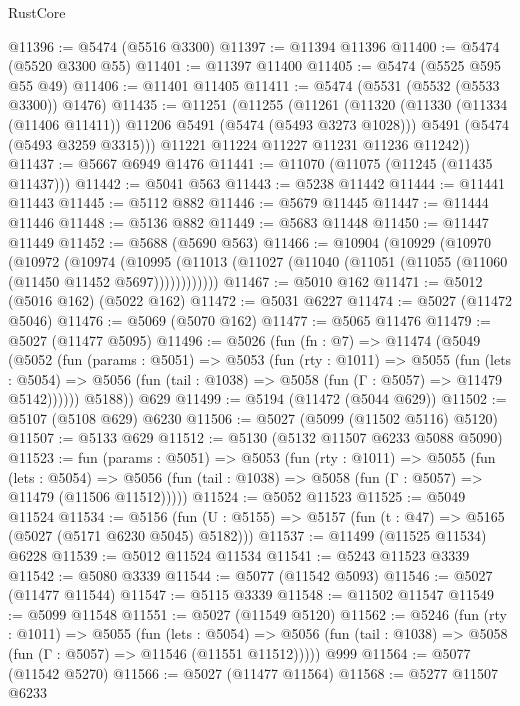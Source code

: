 \begin{lexlean}{RustCore}
\begin{coremodule}
@11396 := @5474 (@5516 @3300)
@11397 := @11394 @11396
@11400 := @5474 (@5520 @3300 @55)
@11401 := @11397 @11400
@11405 := @5474 (@5525 @595 @55 @49)
@11406 := @11401 @11405
@11411 := @5474 (@5531 (@5532 (@5533 @3300)) @1476)
@11435 := @11251
    (@11255
      (@11261
        (@11320
          (@11330 (@11334 (@11406 @11411)) @11206 @5491 (@5474 (@5493 @3273 @1028)))
          @5491
          (@5474 (@5493 @3259 @3315)))
        @11221
        @11224
        @11227
        @11231
        @11236
        @11242))
@11437 := @5667 @6949 @1476
@11441 := @11070 (@11075 (@11245 (@11435 @11437)))
@11442 := @5041 @563
@11443 := @5238 @11442
@11444 := @11441 @11443
@11445 := @5112 @882
@11446 := @5679 @11445
@11447 := @11444 @11446
@11448 := @5136 @882
@11449 := @5683 @11448
@11450 := @11447 @11449
@11452 := @5688 (@5690 @563)
@11466 := @10904
    (@10929
      (@10970
        (@10972
          (@10974
            (@10995 (@11013 (@11027 (@11040 (@11051 (@11055 (@11060 (@11450 @11452 @5697))))))))))))
@11467 := @5010 @162
@11471 := @5012 (@5016 @162) (@5022 @162)
@11472 := @5031 @6227
@11474 := @5027 (@11472 @5046)
@11476 := @5069 (@5070 @162)
@11477 := @5065 @11476
@11479 := @5027 (@11477 @5095)
@11496 := @5026
    (fun (fn : @7) =>
    @11474
      (@5049
        (@5052
          (fun (params : @5051) =>
          @5053
            (fun (rty : @1011) =>
            @5055
              (fun (lets : @5054) =>
              @5056 (fun (tail : @1038) => @5058 (fun (Γ : @5057) => @11479 @5142))))))
        @5188))
    @629
@11499 := @5194 (@11472 (@5044 @629))
@11502 := @5107 (@5108 @629) @6230
@11506 := @5027 (@5099 (@11502 @5116) @5120)
@11507 := @5133 @629
@11512 := @5130 (@5132 @11507 @6233 @5088 @5090)
@11523 := fun (params : @5051) =>
  @5053
    (fun (rty : @1011) =>
    @5055
      (fun (lets : @5054) =>
      @5056 (fun (tail : @1038) => @5058 (fun (Γ : @5057) => @11479 (@11506 @11512)))))
@11524 := @5052 @11523
@11525 := @5049 @11524
@11534 := @5156
    (fun (U : @5155) => @5157 (fun (t : @47) => @5165 (@5027 (@5171 @6230 @5045) @5182)))
@11537 := @11499 (@11525 @11534) @6228
@11539 := @5012 @11524 @11534
@11541 := @5243 @11523 @3339
@11542 := @5080 @3339
@11544 := @5077 (@11542 @5093)
@11546 := @5027 (@11477 @11544)
@11547 := @5115 @3339
@11548 := @11502 @11547
@11549 := @5099 @11548
@11551 := @5027 (@11549 @5120)
@11562 := @5246
    (fun (rty : @1011) =>
    @5055
      (fun (lets : @5054) =>
      @5056 (fun (tail : @1038) => @5058 (fun (Γ : @5057) => @11546 (@11551 @11512)))))
    @999
@11564 := @5077 (@11542 @5270)
@11566 := @5027 (@11477 @11564)
@11568 := @5277 @11507 @6233

\end{coremodule}
\end{lexlean}
